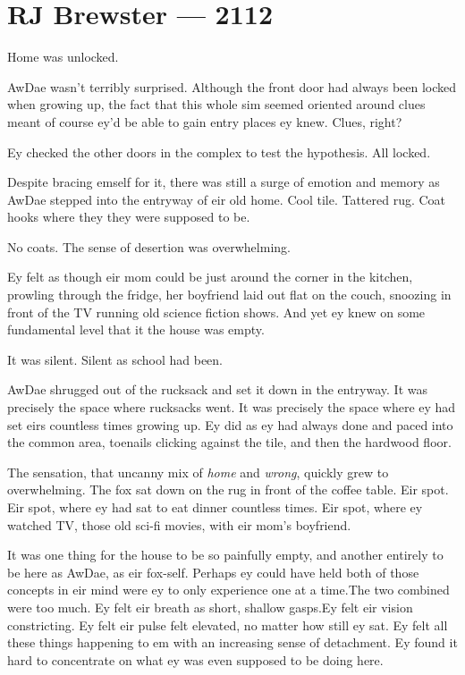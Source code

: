 \hypertarget{rj-brewster-2112}{%
\chapter*{RJ Brewster — 2112}\label{rj-brewster-2112}}

Home was unlocked.

AwDae wasn't terribly surprised. Although the front door had always been locked when growing up, the fact that this whole sim seemed oriented around clues meant of course ey'd be able to gain entry places ey knew. Clues, right?

Ey checked the other doors in the complex to test the hypothesis. All locked.

Despite bracing emself for it, there was still a surge of emotion and memory as AwDae stepped into the entryway of eir old home. Cool tile. Tattered rug. Coat hooks where they they were supposed to be.

No coats. The sense of desertion was overwhelming.

Ey felt as though eir mom could be just around the corner in the kitchen, prowling through the fridge, her boyfriend laid out flat on the couch, snoozing in front of the TV running old science fiction shows. And yet ey knew on some fundamental level that it the house was empty.

It was silent. Silent as school had been.

AwDae shrugged out of the rucksack and set it down in the entryway. It was precisely the space where rucksacks went. It was precisely the space where ey had set eirs countless times growing up. Ey did as ey had always done and paced into the common area, toenails clicking against the tile, and then the hardwood floor.

The sensation, that uncanny mix of \emph{home} and \emph{wrong}, quickly grew to overwhelming. The fox sat down on the rug in front of the coffee table. Eir spot. Eir spot, where ey had sat to eat dinner countless times. Eir spot, where ey watched TV, those old sci-fi movies, with eir mom's boyfriend.

It was one thing for the house to be so painfully empty, and another entirely to be here as AwDae, as eir fox-self. Perhaps ey could have held both of those concepts in eir mind were ey to only experience one at a time.The two combined were too much. Ey felt eir breath as short, shallow gasps.Ey felt eir vision constricting. Ey felt eir pulse felt elevated, no matter how still ey sat. Ey felt all these things happening to em with an increasing sense of detachment. Ey found it hard to concentrate on what ey was even supposed to be doing here.

